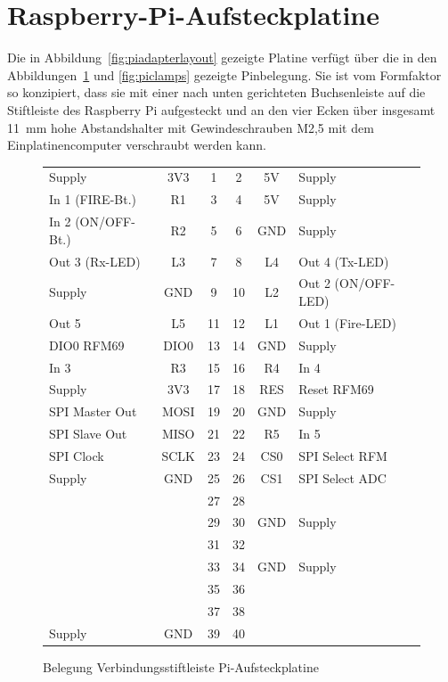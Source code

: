 \documentclass[paper=a4, parskip, numbers=noenddot, toc=listof, headsepline]{scrbook}
\begin{document}
		\section{Raspberry-Pi-Aufsteckplatine}

			Die in Abbildung~\ref{fig:piadapterlayout} gezeigte Platine verfügt über die in den Abbildungen~\ref{fig:piheader} und \ref{fig:piclamps} gezeigte Pinbelegung. Sie ist vom Formfaktor so konzipiert, dass sie mit einer nach unten gerichteten Buchsenleiste auf die Stiftleiste des Raspberry Pi aufgesteckt und an den vier Ecken über insgesamt \SI{11}{\milli\metre} hohe Abstandshalter mit Gewindeschrauben M2,5 mit dem Einplatinencomputer verschraubt werden kann.

			\begin{figure}
				\centering
				\begin{tabu}
					to \textwidth {Xc|cc|cX}
					Supply            & 3V3  & 1  & 2  & 5V  & Supply             \\
					In 1 (FIRE-Bt.)   & R1   & 3  & 4  & 5V  & Supply             \\
					In 2 (ON/OFF-Bt.) & R2   & 5  & 6  & GND & Supply             \\
					Out 3 (Rx-LED)    & L3   & 7  & 8  & L4  & Out 4 (Tx-LED)     \\
					Supply            & GND  & 9  & 10 & L2  & Out 2 (ON/OFF-LED) \\
					Out 5             & L5   & 11 & 12 & L1  & Out 1 (Fire-LED)   \\
					DIO0 RFM69        & DIO0 & 13 & 14 & GND & Supply             \\
					In 3              & R3   & 15 & 16 & R4  & In 4               \\
					Supply            & 3V3  & 17 & 18 & RES & Reset RFM69        \\
					SPI Master Out    & MOSI & 19 & 20 & GND & Supply             \\
					SPI Slave Out     & MISO & 21 & 22 & R5  & In 5               \\
					SPI Clock         & SCLK & 23 & 24 & CS0 & SPI Select RFM     \\
					Supply            & GND  & 25 & 26 & CS1 & SPI Select ADC     \\
					~                 &      & 27 & 28 &     &                    \\
					~                 &      & 29 & 30 & GND & Supply             \\
					~                 &      & 31 & 32 &     &                    \\
					~                 &      & 33 & 34 & GND & Supply             \\
					~                 &      & 35 & 36 &     &                    \\
					~                 &      & 37 & 38 &     &                    \\
					Supply            & GND  & 39 & 40 &     &                    \\ 
				\end{tabu}
				\caption{Belegung Verbindungsstiftleiste Pi-Aufsteckplatine}
				\label{fig:piheader}
			\end{figure}
\end{document}
